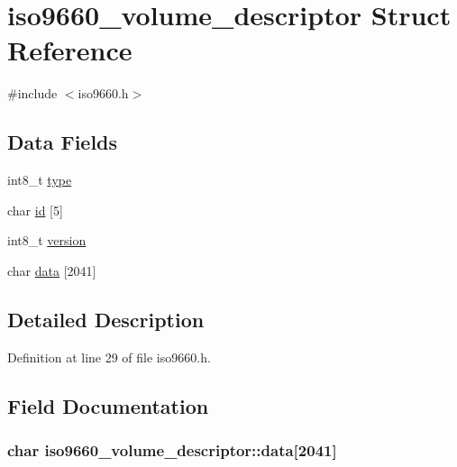 \hypertarget{structiso9660__volume__descriptor}{\section{iso9660\+\_\+volume\+\_\+descriptor Struct Reference}
\label{structiso9660__volume__descriptor}
}


{\ttfamily \#include $<$iso9660.\+h$>$}

\subsection*{Data Fields}
\begin{DoxyCompactItemize}
\item 
int8\+\_\+t \hyperlink{structiso9660__volume__descriptor_a4a6176bdba9bffc0ce8449819ea0607b}{type}
\item 
char \hyperlink{structiso9660__volume__descriptor_a8f6d3d0d6c09036a09ba6236fcadef24}{id} \mbox{[}5\mbox{]}
\item 
int8\+\_\+t \hyperlink{structiso9660__volume__descriptor_a925c16dc5ba2782b30213c5bb5654f0d}{version}
\item 
char \hyperlink{structiso9660__volume__descriptor_aac66dd35d3b45b6e8eab687c935a912a}{data} \mbox{[}2041\mbox{]}
\end{DoxyCompactItemize}


\subsection{Detailed Description}


Definition at line 29 of file iso9660.\+h.



\subsection{Field Documentation}
\hypertarget{structiso9660__volume__descriptor_aac66dd35d3b45b6e8eab687c935a912a}{
\subsubsection[{data}]{\setlength{\rightskip}{0pt plus 5cm}char iso9660\+\_\+volume\+\_\+descriptor\+::data\mbox{[}2041\mbox{]}}}\label{structiso9660__volume__descriptor_aac66dd35d3b45b6e8eab687c935a912a}


